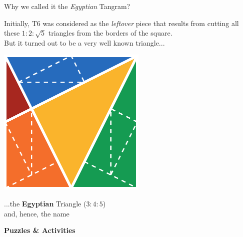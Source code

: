 \documentclass[14pt]{beamer}
\begin{document}
    \begin{frame}{Why we called it the \emph{Egyptian} Tangram?}
        \begin{center}
            {\small Initially, T6 was considered as the \emph{leftover} piece that results from cutting all these $1\!\!:\!\!2\!\!:\!\!\sqrt{5}$ triangles from the borders of the square.\\But it turned out to be a very well known triangle...}

            \bigskip \bigskip

            \includegraphics[height=15ex]{figures/figure003a.pdf} \\

            \bigskip \bigskip

            ...the \textbf{Egyptian} Triangle ($3\!\!:\!\!4\!\!:\!\!5$)\\{\small and, hence, the name}
        \end{center}
    \end{frame}


    \begin{frame}{}
        \begin{center}
            \textbf{\Huge Puzzles \& Activities}\\
        \end{center}
    \end{frame}

\end{document}
